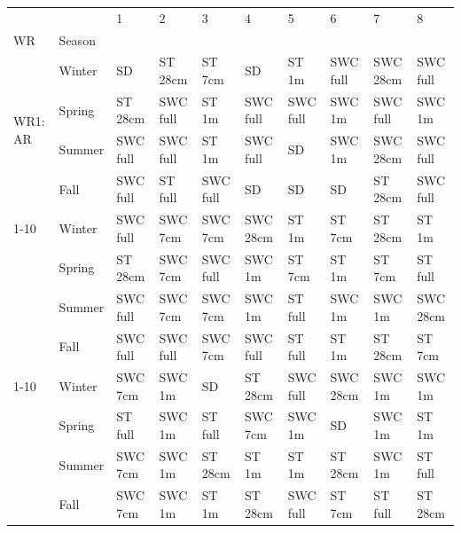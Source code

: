 \begin{tabular}{llllllllll}
\toprule
        &      &         1 &         2 &         3 &         4 &         5 &         6 &         7 &         8 \\
WR & Season &           &           &           &           &           &           &           &           \\
\midrule
\multirow{4}{*}{WR1: AR} & Winter &        SD &   ST 28cm &    ST 7cm &        SD &     ST 1m &  SWC full &  SWC 28cm &  SWC full \\
        & Spring &   ST 28cm &  SWC full &     ST 1m &  SWC full &  SWC full &    SWC 1m &  SWC full &    SWC 1m \\
        & Summer &  SWC full &  SWC full &     ST 1m &  SWC full &        SD &    SWC 1m &  SWC 28cm &  SWC full \\
        & Fall &  SWC full &   ST full &  SWC full &        SD &        SD &        SD &   ST 28cm &  SWC full \\
\cline{1-10}
\multirow{4}{*}{WR2: PT} & Winter &  SWC full &   SWC 7cm &   SWC 7cm &  SWC 28cm &     ST 1m &    ST 7cm &   ST 28cm &     ST 1m \\
        & Spring &   ST 28cm &   SWC 7cm &  SWC full &    SWC 1m &    ST 7cm &     ST 1m &    ST 7cm &   ST full \\
        & Summer &  SWC full &   SWC 7cm &   SWC 7cm &    SWC 1m &   ST full &    SWC 1m &    SWC 1m &  SWC 28cm \\
        & Fall &  SWC full &  SWC full &   SWC 7cm &  SWC full &   ST full &     ST 1m &   ST 28cm &    ST 7cm \\
\cline{1-10}
\multirow{4}{*}{WR3: GH} & Winter &   SWC 7cm &    SWC 1m &        SD &   ST 28cm &  SWC full &  SWC 28cm &    SWC 1m &    SWC 1m \\
        & Spring &   ST full &    SWC 1m &   ST full &   SWC 7cm &    SWC 1m &        SD &    SWC 1m &     ST 1m \\
        & Summer &   SWC 7cm &    SWC 1m &   ST 28cm &     ST 1m &     ST 1m &   ST 28cm &    SWC 1m &   ST full \\
        & Fall &   SWC 7cm &    SWC 1m &     ST 1m &   ST 28cm &  SWC full &    ST 7cm &   ST full &   ST 28cm \\
\bottomrule
\end{tabular}
